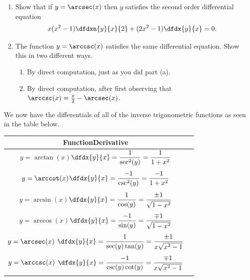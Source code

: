 \begin{embeddedproblem-enumerate}
  \begin{enumerate}[label={\bf{}(\alph*)}]
  \item Show that if $y=\arcsec(x)$ then $y$ satisfies the second order
    differential equation
    $$
    x(x^2-1)\dfdxn{y}{x}{2}+(2x^2-1)\dfdx{y}{x}=0.
    $$
  \item The function   $y=\arccsc(x)$ satisfies the same differential
    equation. Show this in two different ways.
    \begin{enumerate}[label={\bf{}(\roman*)}]{}
    \item By direct computation, just as you did part (a).
    \item By direct computation, after first observing that $\arccsc(x)=\frac\pi2-\arcsec(x)$.
    \end{enumerate}
  \end{enumerate}{}
\end{embeddedproblem-enumerate}


We now have the differentials of all of the inverse trigonometric
functions as seen in the table below.
\begin{center}
  \begin{tabular}{|cc|} \hline
    Function\amp{}Derivative\\\hline\hline
      $y=\arctan(x)$\amp{}$\displaystyle\dfdx{y}{x}=\frac{1}{\sec^2(y)}=\frac{1}{1+x^2}$\\
      \amp{}\\
      $y=\arccot(x)$\amp{}$\displaystyle\dfdx{y}{x}=\frac{-1}{\csc^2(y)}=\frac{-1}{1+x^2}$\\
      \amp{}\\
      $y=\arcsin(x)$\amp{}$\displaystyle\dfdx{y}{x}=\frac{1}{\cos(y)}=\frac{\pm1}{\sqrt{1-x^2}}$\\
      \amp{}\\
      $y=\arccos(x)$\amp{}$\displaystyle\dfdx{y}{x}=\frac{-1}{\sin(y)}=\frac{\mp1}{\sqrt{1-x^2}}$\\
      \amp{}\\
  $y=\arcsec(x)$ \amp{}$\displaystyle\dfdx{y}{x}=\frac{1}{\sec(y)\tan(y)}=\frac{\pm1}{x\sqrt{x^2-1}}$\\
      \amp{}\\
$y=\arccsc(x)$ \amp{} $\displaystyle\dfdx{y}{x}=\frac{-1}{\csc(y)\cot(y)}=\frac{\mp1}{x\sqrt{x^2-1}}$\\
      \amp{}\\\hline
    \end{tabular}
  \end{center}

